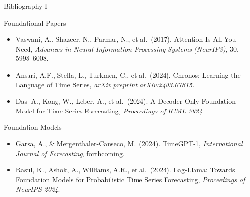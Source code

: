 \documentclass[9pt, aspectratio=169, t]{beamer}
\begin{document}
\begin{frame}{Bibliography I}
    \begin{block}{Foundational Papers}
        {\footnotesize
        \begin{itemize}\setlength{\itemsep}{0pt}
            \item Vaswani, A., Shazeer, N., Parmar, N., et al.\ (2017). Attention Is All You Need, \textit{Advances in Neural Information Processing Systems (NeurIPS)}, 30, 5998--6008.
            \item Ansari, A.F., Stella, L., Turkmen, C., et al.\ (2024). Chronos: Learning the Language of Time Series, \textit{arXiv preprint arXiv:2403.07815}.
            \item Das, A., Kong, W., Leber, A., et al.\ (2024). A Decoder-Only Foundation Model for Time-Series Forecasting, \textit{Proceedings of ICML 2024}.
        \end{itemize}
        }
    \end{block}

    \begin{exampleblock}{Foundation Models}
        {\footnotesize
        \begin{itemize}\setlength{\itemsep}{0pt}
            \item Garza, A., \& Mergenthaler-Canseco, M.\ (2024). TimeGPT-1, \textit{International Journal of Forecasting}, forthcoming.
            \item Rasul, K., Ashok, A., Williams, A.R., et al.\ (2024). Lag-Llama: Towards Foundation Models for Probabilistic Time Series Forecasting, \textit{Proceedings of NeurIPS 2024}.
        \end{itemize}
        }
    \end{exampleblock}
\end{frame}
\end{document}

